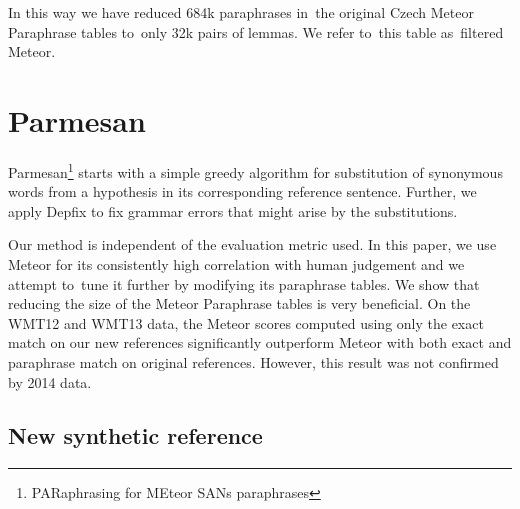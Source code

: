 \documentclass[11pt]{article}
\begin{document}
In this way we have reduced 684k paraphrases in~the original Czech Meteor Paraphrase tables 
to~only 32k pairs of lemmas. We refer to~this table as~filtered Meteor.


\section{Parmesan}


Parmesan\footnote{PARaphrasing for MEteor SANs paraphrases} starts with a simple greedy algorithm for 
substitution of synonymous words from a hypothesis in its corresponding reference sentence. Further, 
we apply Depfix \cite{depfix} to fix grammar errors that might arise by the substitutions.

Our method is independent of the evaluation metric used. In this paper, we use Meteor for its consistently 
high correlation with human judgement and we attempt to~tune it further by modifying its paraphrase tables. 
We show that reducing the size of the Meteor Paraphrase tables is very beneficial. On the WMT12 and WMT13 data,
the Meteor scores computed using only the exact match on our new references significantly outperform Meteor 
with both exact and paraphrase match on original references. However, this result was not confirmed by 2014 
data. %




\subsection{New synthetic reference}
\end{document}
